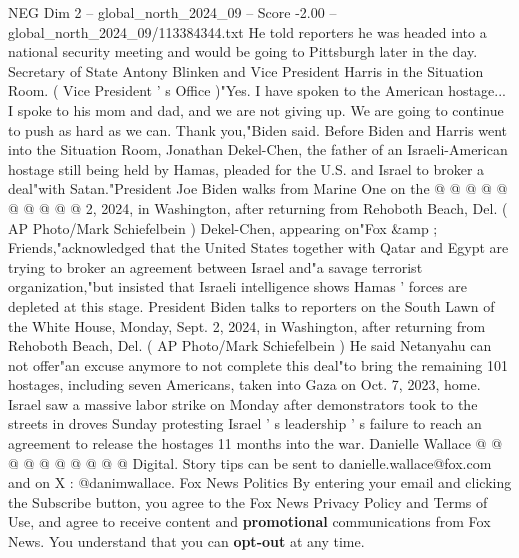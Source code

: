 \begin{textsample}{NEG Dim 2 – global\_north\_2024\_09 – Score -2.00 – global\_north\_2024\_09/113384344.txt}
He told reporters he was headed into a national security meeting and would be going to Pittsburgh later in the day.
Secretary of State Antony Blinken and Vice President Harris in the Situation Room. ( Vice President ' s Office )"Yes.
I have spoken to the American hostage...
I spoke to his mom and dad, and we are not giving up.
We are going to continue to push as hard as we can.
Thank you,"Biden said.
Before Biden and Harris went into the Situation Room, Jonathan Dekel-Chen, the father of an Israeli-American hostage still being held by Hamas, pleaded for the U.S. and Israel to broker a deal"with Satan."President Joe Biden walks from Marine One on the @ @ @ @ @ @ @ @ @ @ 2, 2024, in Washington, after returning from Rehoboth Beach, Del. ( AP Photo/Mark Schiefelbein ) Dekel-Chen, appearing on"Fox \&amp ; Friends,"acknowledged that the United States together with Qatar and Egypt are trying to broker an agreement between Israel and"a savage terrorist organization,"but insisted that Israeli intelligence shows Hamas ' forces are depleted at this stage.
President Biden talks to reporters on the South Lawn of the White House, Monday, Sept. 2, 2024, in Washington, after returning from Rehoboth Beach, Del. ( AP Photo/Mark Schiefelbein ) He said Netanyahu can not offer"an excuse anymore to not complete this deal"to bring the remaining 101 hostages, including seven Americans, taken into Gaza on Oct. 7, 2023, home.
Israel saw a massive labor strike on Monday after demonstrators took to the streets in droves Sunday protesting Israel ' s leadership ' s failure to reach an agreement to release the hostages 11 months into the war.
Danielle Wallace @ @ @ @ @ @ @ @ @ @ Digital.
Story tips can be sent to danielle.wallace@fox.com and on X : @danimwallace.
Fox News Politics By entering your email and clicking the Subscribe button, you agree to the Fox News Privacy Policy and Terms of Use, and agree to receive content and \textbf{promotional} communications from Fox News.
You understand that you can \textbf{opt-out} at any time.

\end{textsample}
